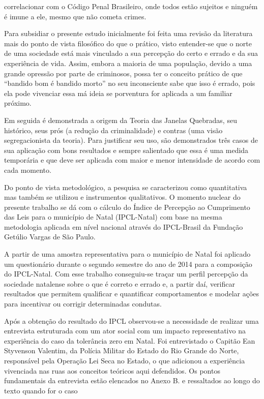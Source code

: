 \documentclass[
	12pt,				%
	openright,			%
	twoside,			%
	a4paper,			%
	chapter=TITLE,		%
	section=TITLE,		%
	subsection=TITLE,	%
	subsubsection=TITLE,%
	spanish,            %
	english,			%
	brazil				%
	]{abntex2}
\begin{document}
correlacionar com o Código Penal Brasileiro, onde todos estão sujeitos e ninguém é imune a ele, mesmo que não cometa crimes.
\par
Para subsidiar o presente estudo inicialmente foi feita uma revisão da literatura mais do ponto de vista filosófico do que
o prático, visto entender-se que o norte de uma sociedade está mais vinculado a sua percepção do certo e errado e da sua experiência de vida. Assim, embora a maioria de uma população, devido a uma grande opressão por parte de criminosos,  possa ter o conceito prático de
que “bandido bom é bandido morto” no seu inconsciente sabe que isso é errado, pois ela pode vivenciar essa má ideia se porventura for aplicada a um familiar próximo.
\par
Em seguida é demonstrada a origem da Teoria das Janelas Quebradas, seu histórico, seus prós (a redução da criminalidade) e contras (uma visão segregacionista da teoria). Para justificar seu uso, são demonstrados três casos de sua aplicação com bons resultados e sempre salientado que essa é uma medida temporária e que deve ser aplicada com maior e menor intensidade de acordo com cada momento.
\par
Do ponto de vista metodológico, a pesquisa se caracterizou como quantitativa mas também se utilizou e instrumentos qualitativos. O momento nuclear do presente trabalho se dá com o cálculo do Índice de Percepção ao Cumprimento das Leis para o município de Natal (IPCL-Natal) com base na mesma metodologia aplicada em nível nacional através do IPCL-Brasil da Fundação Getúlio Vargas de São Paulo. 
\par
A partir de uma amostra representativa para o município de Natal foi aplicado um questionário durante o segundo semestre do ano de 2014 para a composição do IPCL-Natal. Com esse trabalho conseguiu-se traçar um perfil percepção da sociedade natalense sobre o que é correto e errado e, a partir daí, verificar
resultados que permitem qualificar e quantificar comportamentos e modelar ações para incentivar ou corrigir determinadas condutas.
\par
Após a obtenção do resultado do IPCL observou-se a necessidade  de realizar uma entrevista estruturada com um ator social com um impacto representativo na experiência do caso da tolerância zero em Natal. Foi entrevistado o Capitão Ean Styvenson Valentim, da Polícia Militar do Estado do Rio Grande do Norte, responsável pela Operação Lei Seca no Estado, o que adicionou a experiência vivenciada nas ruas aos conceitos teóricos aqui defendidos. Os pontos fundamentais da entrevista estão elencados no Anexo B. e ressaltados ao longo do texto quando for o caso
\end{document}
